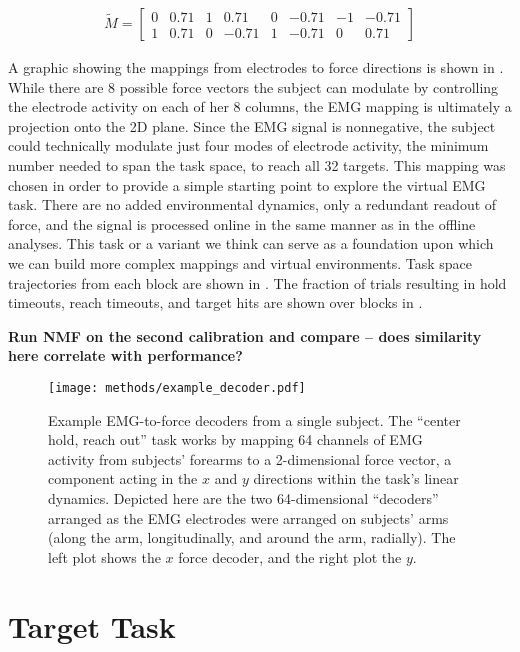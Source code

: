 \documentclass[../main.tex]{subfiles}
\begin{document}
\begin{align}
\tilde{M} =
\begin{bmatrix}
0  & 0.71  & 1   & 0.71   & 0  & -0.71  & -1  & -0.71 \\
1  & 0.71  & 0  & -0.71  & 1   & -0.71   & 0   & 0.71
\end{bmatrix}
\end{align}

A graphic showing the mappings from electrodes to force directions is shown in . While there are 8 possible force vectors the subject can modulate by controlling the electrode activity on each of her 8 columns, the EMG mapping is ultimately a projection onto the 2D plane. Since the EMG signal is nonnegative, the subject could technically modulate just four modes of electrode activity, the minimum number needed to span the task space, to reach all 32 targets. This mapping was chosen in order to provide a simple starting point to explore the virtual EMG task. There are no added environmental dynamics, only a redundant readout of force, and the signal is processed online in the same manner as in the offline analyses. This task or a variant we think can serve as a foundation upon which we can build more complex mappings and virtual environments. Task space trajectories from each block are shown in . The fraction of trials resulting in hold timeouts, reach timeouts, and target hits are shown over blocks in .


\textbf{Run NMF on the second calibration and compare – does similarity here correlate with performance?}


\begin{figure}[H]
  \centering
  \texttt{[image: methods/example\_decoder.pdf]}
  \caption[Example subject decoder]{Example EMG-to-force decoders from a single subject. The ``center hold, reach out'' task works by mapping 64 channels of EMG activity from subjects' forearms to a 2-dimensional force vector, a component acting in the $x$ and $y$ directions within the task's linear dynamics. Depicted here are the two 64-dimensional ``decoders'' arranged as the EMG electrodes were arranged on subjects' arms (along the arm, longitudinally, and around the arm, radially). The left plot shows the $x$ force decoder, and the right plot the $y$.}\label{fig:example_decoder}
\end{figure}



\section{Target Task}
\end{document}
